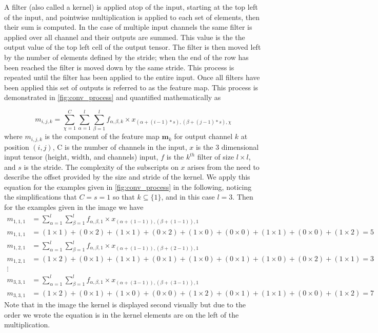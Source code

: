 \documentclass[12pt]{article}
\numberwithin{equation}{section}
\numberwithin{figure}{section}
\begin{document}
A filter (also called a kernel) is applied atop of the input, starting at the top left of the input, and pointwise multiplication is applied to each set of elements, then their sum is computed. In the case of multiple input channels the same filter is applied over all channel and their outputs are summed. This value is the the output value of the top left cell of the output tensor. The filter is then moved left by the number of elements defined by the stride; when the end of the row has been reached the filter is moved down by the same stride. This process is repeated until the filter has been applied to the entire input. Once all filters have been applied this set of outputs is referred to as the feature map. This process is demonstrated in \cref{fig:conv_process} and quantified mathematically as

\begin{equation}
	m_{i,j,k} = \sum_{\chi = 1}^{C}\sum_{\alpha = 1}^{l}\sum_{\beta = 1}^{l} f_{\alpha,\beta, k} \times x_{(\alpha +(i-1)*s), (\beta + (j-1)*s),\chi}
\end{equation}
where $m_{i,j,k}$ is the component of the feature map $\bm{m}_k$ for output channel $k$ at position $(i, j)$, C is the number of channels in the input, $x$ is the 3 dimensional input tensor (height, width, and channels) input, $f$ is the $k^{th}$ filter of size $l\times l$, and $s$ is the stride. The complexity of the subscripts on $x$ arises from the need to describe the offset provided by the size and stride of the kernel. We apply this equation for the examples given in \cref{fig:conv_process} in the following, noticing the simplifications that $C = s = 1$ so that $k \subseteq \{1\}$, and in this case $l = 3$. Then for the examples given in the image we have
\begin{align}
	m_{1, 1, 1} &= \sum_{\alpha = 1}^{l}\sum_{\beta = 1}^{l} f_{\alpha,\beta, 1} \times x_{(\alpha +(1-1)), (\beta + (1-1)),1}	\\
	m_{1, 1, 1} &= (1\times1 )+ (0 \times 2) + (1 \times 1) + (0 \times 2) + (1 \times 0) + (0 \times 0) + (1 \times 1) + (0 \times 0) + (1 \times 2) = 5 \\
	m_{1, 2, 1} &= \sum_{\alpha = 1}^{l}\sum_{\beta = 1}^{l} f_{\alpha,\beta, 1} \times x_{(\alpha +(1-1)), (\beta + (2-1)),1}	\\
	m_{1, 2, 1} &= (1\times 2)+ (0 \times 1) + (1 \times 1) + (0 \times 1) + (1 \times 0) + (0 \times 1) + (1 \times 0) + (0 \times 2) + (1 \times 1) = 3 \\
	\vdots \nonumber	\\
	m_{3, 3, 1} &= \sum_{\alpha = 1}^{l}\sum_{\beta = 1}^{l} f_{\alpha,\beta, 1} \times x_{(\alpha +(3-1)), (\beta + (3-1)),1}	\\
	m_{3, 3, 1} &= (1\times 2)+ (0 \times 1) + (1 \times 0) + (0 \times 0) + (1 \times 2) + (0 \times 1) + (1 \times 1) + (0 \times 0) + (1 \times 2) = 7
\end{align}
Note that in the image the kernel is displayed second visually but due to the order we wrote the equation is in the kernel elements are on the left of the multiplication.
\end{document}
